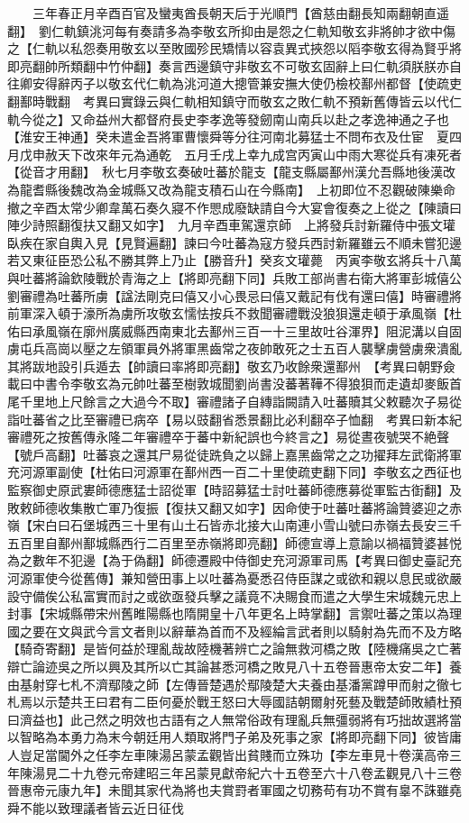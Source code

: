 　　三年春正月辛酉百官及蠻夷酋長朝天后于光順門【酋慈由翻長知兩翻朝直遥翻】　劉仁軌鎮洮河每有奏請多為李敬玄所抑由是怨之仁軌知敬玄非將帥才欲中傷之【仁軌以私怨奏用敬玄以至敗國殄民矯情以容袁異式挾怨以䧟李敬玄得為賢乎將即亮翻帥所類翻中竹仲翻】奏言西邊鎮守非敬玄不可敬玄固辭上曰仁軌須朕朕亦自往卿安得辭丙子以敬玄代仁軌為洮河道大摠管兼安撫大使仍檢校鄯州都督【使疏吏翻鄯時戰翻　考異曰實錄云與仁軌相知鎮守而敬玄之敗仁軌不預新舊傳皆云以代仁軌今從之】又命益州大都督府長史李孝逸等發劒南山南兵以赴之孝逸神通之子也【淮安王神通】癸未遣金吾將軍曹懷舜等分往河南北募猛士不問布衣及仕宦　夏四月戊申赦天下改來年元為通乾　五月壬戌上幸九成宫丙寅山中雨大寒從兵有凍死者【從音才用翻】　秋七月李敬玄奏破吐蕃於龍支【龍支縣屬鄯州漢允吾縣地後漢改為龍耆縣後魏改為金城縣又改為龍支積石山在今縣南】　上初即位不忍觀破陳樂命撤之辛酉太常少卿韋萬石奏久寢不作愳成廢缺請自今大宴會復奏之上從之【陳讀曰陣少詩照翻復扶又翻又如字】　九月辛酉車駕還京師　上將發兵討新羅侍中張文瓘臥疾在家自輿入見【見賢遍翻】諫曰今吐蕃為寇方發兵西討新羅雖云不順未嘗犯邊若又東征臣恐公私不勝其弊上乃止【勝音升】癸亥文瓘薨　丙寅李敬玄將兵十八萬與吐蕃將論欽陵戰於青海之上【將即亮翻下同】兵敗工部尚書右衛大將軍彭城僖公劉審禮為吐蕃所虜【諡法剛克曰僖又小心畏忌曰僖又戴記有伐有還曰僖】時審禮將前軍深入頓于濠所為虜所攻敬玄懦怯按兵不救聞審禮戰没狼狽還走頓于承風嶺【杜佑曰承風嶺在廓州廣威縣西南東北去鄯州三百一十三里故吐谷渾界】阻泥溝以自固虜屯兵高崗以壓之左領軍員外將軍黑齒常之夜帥敢死之士五百人襲擊虜營虜衆潰亂其將跋地設引兵遁去【帥讀曰率將即亮翻】敬玄乃收餘衆還鄯州　【考異曰朝野僉載曰中書令李敬玄為元帥吐蕃至樹敦城聞劉尚書没蕃著鞾不得狼狽而走遺却麥飯首尾千里地上尺餘言之大過今不取】審禮諸子自縳詣闕請入吐蕃贖其父敕聽次子易從詣吐蕃省之比至審禮已病卒【易以豉翻省悉景翻比必利翻卒子恤翻　考異曰新本紀審禮死之按舊傳永隆二年審禮卒于蕃中新紀誤也今終言之】易從晝夜號哭不絶聲【號戶高翻】吐蕃哀之還其尸易從徒跣負之以歸上嘉黑齒常之之功擢拜左武衛將軍充河源軍副使【杜佑曰河源軍在鄯州西一百二十里使疏吏翻下同】李敬玄之西征也監察御史原武婁師德應猛士詔從軍【時詔募猛士討吐蕃師德應募從軍監古衘翻】及敗敕師德收集散亡軍乃復振【復扶又翻又如字】因命使于吐蕃吐蕃將論贊婆迎之赤嶺【宋白曰石堡城西三十里有山土石皆赤北接大山南連小雪山號曰赤嶺去長安三千五百里自鄯州鄯城縣西行二百里至赤嶺將即亮翻】師德宣導上意諭以禍福贊婆甚悦為之數年不犯邊【為于偽翻】師德遷殿中侍御史充河源軍司馬【考異曰御史臺記充河源軍使今從舊傳】兼知營田事上以吐蕃為憂悉召侍臣謀之或欲和親以息民或欲嚴設守備俟公私富實而討之或欲亟發兵擊之議竟不决賜食而遣之大學生宋城魏元忠上封事【宋城縣帶宋州舊睢陽縣也隋開皇十八年更名上時掌翻】言禦吐蕃之策以為理國之要在文與武今言文者則以辭華為首而不及經綸言武者則以騎射為先而不及方略【騎奇寄翻】是皆何益於理亂哉故陸機著辨亡之論無救河橋之敗【陸機痛吳之亡著辯亡論迹吳之所以興及其所以亡其論甚悉河橋之敗見八十五卷晉惠帝太安二年】養由基射穿七札不濟鄢陵之師【左傳晉楚遇於鄢陵楚大夫養由基潘黨蹲甲而射之徹七札焉以示楚共王曰君有二臣何憂於戰王怒曰大辱國詰朝爾射死藝及戰楚師敗績杜預曰濟益也】此己然之明效也古語有之人無常俗政有理亂兵無彊弱將有巧拙故選將當以智略為本勇力為末今朝廷用人類取將門子弟及死事之家【將即亮翻下同】彼皆庸人豈足當閫外之任李左車陳湯呂蒙孟觀皆出貧賤而立殊功【李左車見十卷漢高帝三年陳湯見二十九卷元帝建昭三年呂蒙見獻帝紀六十五卷至六十八卷孟觀見八十三卷晉惠帝元康九年】未聞其家代為將也夫賞罸者軍國之切務苟有功不賞有辠不誅雖堯舜不能以致理議者皆云近日征伐